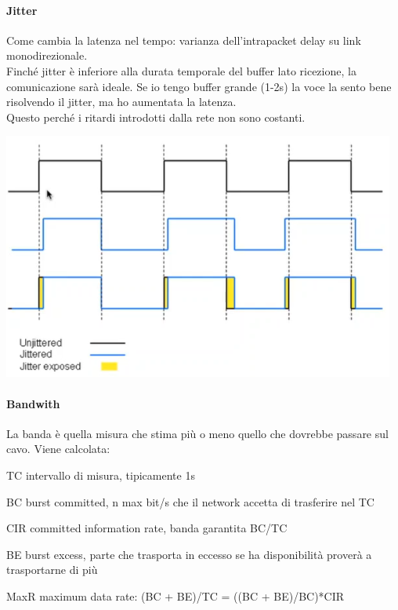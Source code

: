 \documentclass[10pt]{book}
\begin{document}
\paragraph{Jitter} Come cambia la latenza nel tempo: varianza dell'intrapacket delay su link monodirezionale.\\
Finché jitter è inferiore alla durata temporale del buffer lato ricezione, la comunicazione sarà ideale. Se io tengo buffer grande (1-2s) la voce la sento bene risolvendo il jitter, ma ho aumentata la latenza.\\
Questo perché i ritardi introdotti dalla rete non sono costanti.
\begin{center}
	\includegraphics[scale=0.75]{jitter.png}
\end{center}
\paragraph{Bandwith} La banda è quella misura che stima più o meno quello che dovrebbe passare sul cavo. Viene calcolata: 
\begin{list}{}{}
	\item TC intervallo di misura, tipicamente 1s
	\item BC burst committed, n max bit/s che il network accetta di trasferire nel TC
	\item CIR committed information rate, banda garantita BC/TC
	\item BE burst excess, parte che trasporta in eccesso se ha disponibilità proverà a trasportarne di più 
	\item MaxR maximum data rate: (BC + BE)/TC = ((BC + BE)/BC)*CIR
\end{list}
\end{document}
